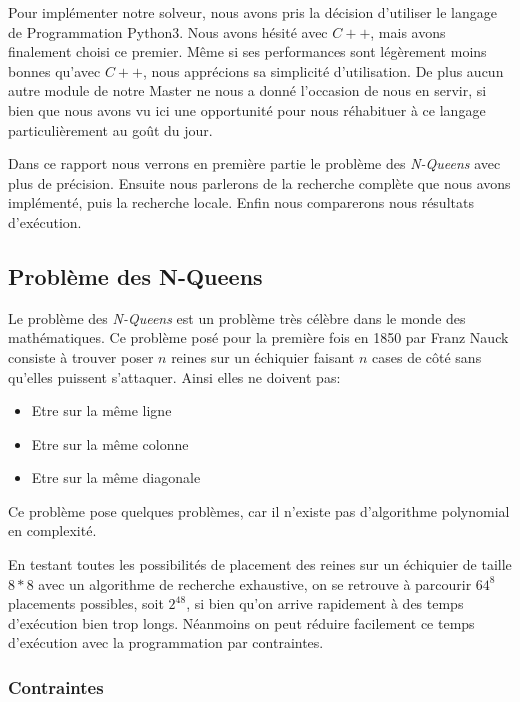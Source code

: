 \documentclass{article}
\begin{document}
Pour implémenter notre solveur, nous avons pris la décision d'utiliser le langage de Programmation Python3. Nous avons hésité avec $C++$, mais avons finalement choisi ce premier. Même si ses performances sont légèrement moins bonnes qu'avec $C++$, nous apprécions sa simplicité d’utilisation. De plus aucun autre module de notre Master ne nous a donné l’occasion de nous en servir, si bien que nous avons vu ici une opportunité pour nous réhabituer à ce langage particulièrement au goût du jour.

Dans ce rapport nous verrons en première partie le problème des \emph{N-Queens} avec plus de précision. Ensuite nous parlerons de la recherche complète que nous avons implémenté, puis la recherche locale. Enfin nous comparerons nous résultats d'exécution. 


\vspace{1cm}

\subsection{Problème des N-Queens}

Le problème des \emph{N-Queens} est un problème très célèbre dans le monde des mathématiques. Ce problème posé pour la première fois en 1850 par Franz Nauck consiste à trouver poser $n$ reines sur un échiquier faisant $n$ cases de côté sans qu'elles puissent s'attaquer. Ainsi elles ne doivent pas: 
\begin{itemize}
\item Etre sur la même ligne
\item Etre sur la même colonne
\item Etre sur la même diagonale
\end{itemize}

Ce problème pose quelques problèmes, car il n'existe pas d'algorithme polynomial en complexité.


En testant toutes les possibilités de placement des reines sur un échiquier de taille $8*8$ avec un algorithme de recherche exhaustive, on se retrouve à parcourir $64^8$ placements possibles, soit $2^{48}$, si bien qu'on arrive rapidement à des temps d'exécution bien trop longs. Néanmoins on peut réduire facilement ce temps d'exécution avec la programmation par contraintes. 


\subsubsection{Contraintes}
\end{document}
